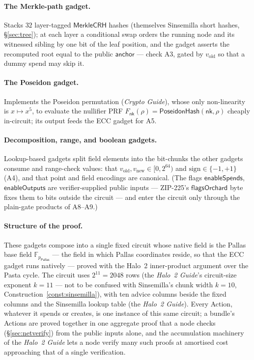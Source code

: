 \documentclass[11pt,a4paper]{article}
\theoremstyle{definition}
\newcommand{\F}{\mathbb{F}}
\newcommand{\Pallas}{\ensuremath{\mathsf{Pallas}}}
\newcommand{\nksym}{\ensuremath{\mathsf{nk}}}
\begin{document}
\paragraph{The Merkle-path gadget.} Stacks $32$ layer-tagged $\mathsf{MerkleCRH}$
hashes (themselves Sinsemilla short hashes, \S\ref{sec:tree}); at each layer a
conditional swap orders the running node and its witnessed sibling by one bit of
the leaf position, and the gadget asserts the recomputed root equal to the public
$\mathsf{anchor}$ --- check A3, gated by $v_{\mathrm{old}}$ so that a dummy spend
may skip it.

\paragraph{The Poseidon gadget.} Implements the Poseidon permutation
(\emph{Crypto Guide}), whose only non-linearity is $x \mapsto x^{5}$, to evaluate
the nullifier PRF $F_{\nksym}(\rho) = \mathsf{PoseidonHash}(\nksym,\rho)$ cheaply
in-circuit; its output feeds the ECC gadget for A5.

\paragraph{Decomposition, range, and boolean gadgets.} Lookup-based gadgets
split field elements into the bit-chunks the other gadgets consume and
range-check values: that $v_{\mathrm{old}}, v_{\mathrm{new}} \in [0, 2^{64})$ and
$\mathrm{sign} \in \{-1,+1\}$ (A4), and that point and field encodings are
canonical. (The flags $\mathsf{enableSpends}$, $\mathsf{enableOutputs}$ are
verifier-supplied public inputs --- ZIP-225's $\mathsf{flagsOrchard}$ byte
fixes them to bits outside the circuit --- and enter the circuit only
through the plain-gate products of A8--A9.)

\paragraph{Structure of the proof.} These gadgets compose into a single fixed
circuit whose native field is the Pallas base field $\F_{p_{\Pallas}}$ --- the
field in which Pallas coordinates reside, so that the ECC gadget runs natively ---
proved with the Halo~2 inner-product argument over the Pasta cycle. The
circuit uses $2^{11} = 2048$ rows (the \emph{Halo~2 Guide}'s circuit-size
exponent $k = 11$ --- not to be confused with Sinsemilla's chunk width
$k = 10$, Construction~\ref{const:sinsemilla}), with ten advice columns
beside the fixed columns and the Sinsemilla lookup table (the
\emph{Halo~2 Guide}). Every Action,
whatever it spends or creates, is one instance of this same circuit; a
bundle's Actions are proved together in one aggregate proof that a node
checks (\S\ref{sec:netverify}) from the public
inputs alone, and the accumulation machinery of the \emph{Halo~2 Guide} lets
a node verify many such proofs at amortised cost approaching that of a single
verification.
\end{document}
